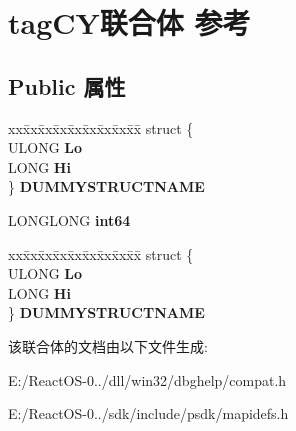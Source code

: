 \hypertarget{uniontag_c_y}{}\section{tag\+C\+Y联合体 参考}
\label{uniontag_c_y}
\subsection*{Public 属性}
\begin{DoxyCompactItemize}
\item 
\mbox{\label{uniontag_c_y_a59bd3d1c36fede226381750a8c8f43e3}} 
\begin{tabbing}
xx\=xx\=xx\=xx\=xx\=xx\=xx\=xx\=xx\=\kill
struct \{\\
\>ULONG {\bfseries Lo}\\
\>LONG {\bfseries Hi}\\
\} {\bfseries DUMMYSTRUCTNAME}\\

\end{tabbing}\item 
\mbox{\label{uniontag_c_y_aa86396b33bde4196caf9d6e23d2f32a9}} 
L\+O\+N\+G\+L\+O\+NG {\bfseries int64}
\item 
\mbox{\label{uniontag_c_y_a4f0075d6275d714bc2d53ec0f2473099}} 
\begin{tabbing}
xx\=xx\=xx\=xx\=xx\=xx\=xx\=xx\=xx\=\kill
struct \{\\
\>ULONG {\bfseries Lo}\\
\>LONG {\bfseries Hi}\\
\} {\bfseries DUMMYSTRUCTNAME}\\

\end{tabbing}\end{DoxyCompactItemize}


该联合体的文档由以下文件生成\+:\begin{DoxyCompactItemize}
\item 
E\+:/\+React\+O\+S-\/0../dll/win32/dbghelp/compat.\+h\item 
E\+:/\+React\+O\+S-\/0../sdk/include/psdk/mapidefs.\+h\end{DoxyCompactItemize}
